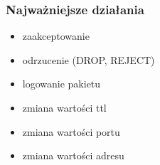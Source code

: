 \documentclass[a4paper,10pt]{book}
\begin{document}
			\subsubsection{Najważniejsze działania}
				\begin{itemize}
					\item zaakceptowanie
					\item odrzucenie (DROP, REJECT)
					\item logowanie pakietu
					\item zmiana wartości ttl
					\item zmiana wartości portu
					\item zmiana wartości adresu
				\end{itemize}
\end{document}
